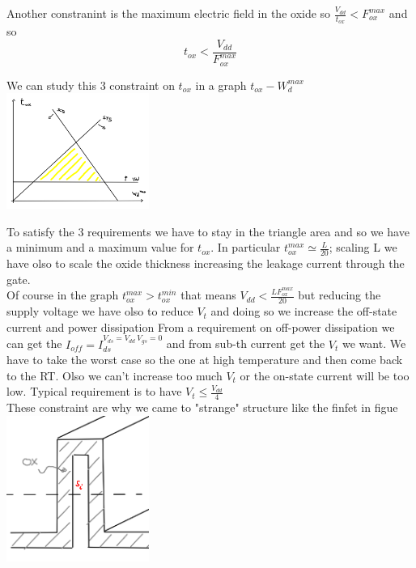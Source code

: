 Another constranint is the maximum electric field in the oxide so $\frac{V_{dd}}{t_{ox}}<F_{ox}^{max}$ and so 
\begin{equation}
t_{ox}<\frac{V_{dd}}{F_{ox}^{max}}
\end{equation}
\vspace{5mm}

We can study this 3 constraint on $t_{ox}$ in a graph $t_{ox}-W_d^{max}$\\

\centering
\includegraphics[width=0.35\textwidth]{trianglemos.png}\\
\raggedright

To satisfy the 3 requirements we have to stay in the triangle area and so we have a minimum and a maximum value for $t_{ox}$. In particular $t_{ox}^{max}\simeq \frac{L}{20}$; scaling L we have olso to scale the oxide thickness increasing the leakage current through the gate.\\

\vspace{5mm}
Of course in the graph $t_{ox}^{max}>t_{ox}^{min}$ that means $V_{dd}<\frac{LF_{ox}^{max}}{20}$ but reducing the supply voltage we have olso to reduce $V_t$ and doing so we increase the off-state current and power dissipation
From a requirement on off-power dissipation we can get the $I_{off}=I_{ds}^{V_{ds}=V_{dd} \ V_{gs}=0}$ and from sub-th current get the $V_t$ we want. We have to take the worst case so the one at high temperature and then come back to the RT. Olso we can't increase too much $V_t$ or the on-state current will be too low. Typical requirement is to have $V_t \le \frac{V_{dd}}{4}$\\

These constraint are why we came to "strange" structure like the finfet in figue \\

\centering
\includegraphics[width=0.35\textwidth]{finfet.png}\\
\raggedright


